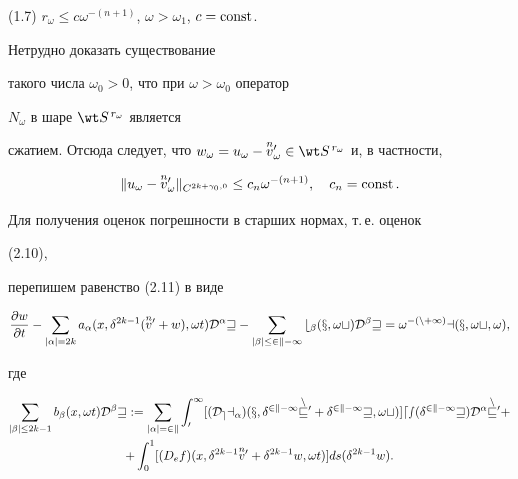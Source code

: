 \begin{pf}
(1.7) $r_\omega\le c\omega^{-(n+1)}$, $\omega>\omega_1$, $c=\operatorname{const}$. 


Нетрудно доказать существование 


такого числа $\omega_0>0$, что при $\omega>\omega_0$ оператор 


$N_\omega$ в шаре $\wt S^{\,r_\omega}$ является 


сжатием. Отсюда следует, что $w_\omega=u_\omega-\up{n}{v}'_\omega\in\wt 


S^{\,r_\omega}$ и, в частности, 


$$ 


\|u_\omega-\up{n}{v}'_\omega\|_{C^{2k+\gamma_0,0}}\le 


c_n\omega^{-(n+1)},\quad c_n=\const. 


$$ 


 


Для получения оценок погрешности в старших нормах, т.\,е. оценок 


(2.10), 


перепишем равенство (2.11) в виде 


\begin{equation} 


\frac{\partial w}{\partial t}-\sum_{|\alpha|=2k} 


a_\alpha(x,\delta^{2k-1}(\up{n}{v}'+w),\omega t) 


\cal D^\alpha w-\sum_{|\beta|\le 2k-1} 


b_\beta(x,\omega t)\cal D^\beta w= 


\omega^{-(n+1)}a(x,\omega t,\omega), 


\end{equation} 


где 


\begin{multline*} 


\sum_{|\beta|\le 2k-1}b_\beta(x,\omega t) 


\cal D^\beta w:=\sum_{|\alpha|=2k} 


\int^1_0 


[(D_e a_\alpha)(x,\delta^{2k-1}\up{n}{v}'+\delta^{2k-1} 


w,\omega t)]ds(\delta^{2k-1}w)\cal D^\alpha\up{n}{v}'+ \\ 


% 


+\int^1_0[(D_e f)(x,\delta^{2k-1}\up{n}{v}'+ 


\delta^{2k-1}w,\omega t)]ds(\delta^{2k-1}w). 



\end{multline*}
\end{pf}
